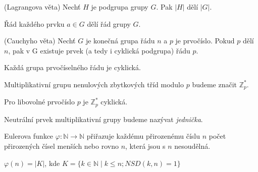\documentclass[
  program=infoi,
  biblatex,
  figures=false,
  glossaries,
  index
]{kidiplom}
\begin{document}
    \begin{theorem}
        (Lagrangova věta)
        Nechť $H$ je podgrupa grupy $G$. Pak $|H|$ dělí $|G|$.
    \end{theorem}

    \begin{consequence}
        Řád každého prvku $a \in G$ dělí řád grupy $G$.
    \end{consequence}

    


    \begin{theorem}
        (Cauchyho věta)
        Nechť $G$ je konečná grupa řádu $n$ a $p$ je prvočíslo.
        Pokud $p$ dělí $n$, pak v G existuje prvek (a tedy i cyklická podgrupa) řádu $p$.
    \end{theorem}

    \begin{consequence}\label{con:prime-cyclic}
        Každá grupa prvočíselného řádu je cyklická.
    \end{consequence}



    \begin{definition}\label{def:Z*p}
        Multiplikativní grupu nenulových zbytkových tříd modulo $p$ budeme značit $\mathbb{Z}^*_p$.
    \end{definition}

    \begin{theorem}
        Pro libovolné prvočíslo $p$ je $\mathbb{Z}^*_p$ cyklická.
    \end{theorem}

    \begin{definition}
        Neutrální prvek multiplikativní grupy budeme nazývat \emph{jednička}.
    \end{definition}




    \begin{definition}
        Eulerova funkce $\varphi: \mathbb{N} \rightarrow \mathbb{N}$ přiřazuje každému přirozenému číslu $n$
        počet přirozených čísel menších nebo rovno $n$, která jsou s $n$ nesoudělná.

        \begin{center}
            $\varphi(n) = |K|$, kde $K = \{k \in \mathbb{N} \mid k \leq n; NSD(k,n)=1\}$
        \end{center}

    \end{definition}
\end{document}
